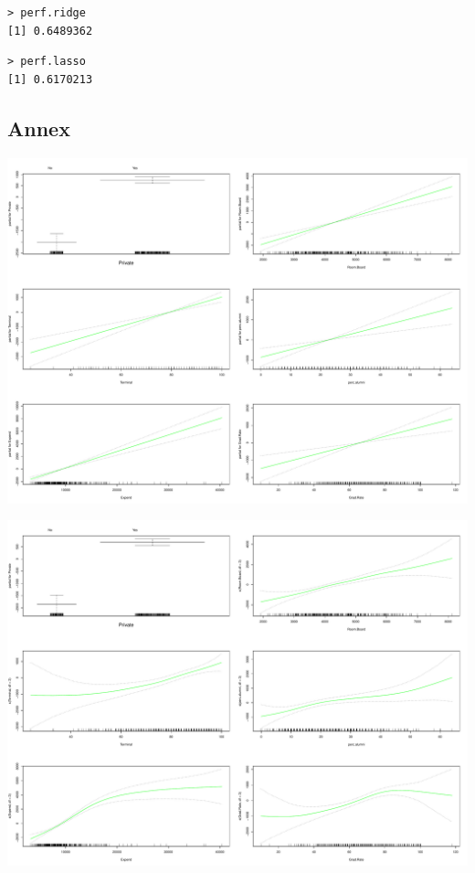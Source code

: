 \documentclass[11pt, a4paper]{article}
\begin{document}
\begin{verbatim}
> perf.ridge
[1] 0.6489362
\end{verbatim}


\begin{verbatim}
> perf.lasso
[1] 0.6170213
\end{verbatim}
\subsection{Annex}
\label{sec-1-3}

\includegraphics[scale=0.4]{gam_trees_s.pdf}

\includegraphics[scale=0.4]{gam_trees_s_3.pdf}
\end{document}

